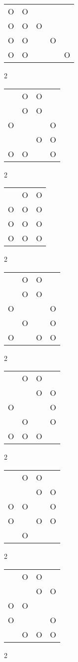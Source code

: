 \begin{tabular}{|m{0.2cm}m{0.2cm}m{0.2cm}m{0.2cm}m{0.2cm}|}\hline
O&O& & & \\
O&O&O& & \\
O&O& &O& \\
O&O& & &O\\
\hline\end{tabular}2
\begin{tabular}{|m{0.2cm}m{0.2cm}m{0.2cm}m{0.2cm}|}\hline
 &O&O& \\
 &O&O& \\
O& & &O\\
 & &O&O\\
O&O& &O\\
\hline\end{tabular}2
\begin{tabular}{|m{0.2cm}m{0.2cm}m{0.2cm}|}\hline
 &O&O\\
O&O&O\\
O&O&O\\
O&O&O\\
\hline\end{tabular}2
\begin{tabular}{|m{0.2cm}m{0.2cm}m{0.2cm}m{0.2cm}|}\hline
 &O&O& \\
 &O&O& \\
O& & &O\\
 &O& &O\\
O& &O&O\\
\hline\end{tabular}2
\begin{tabular}{|m{0.2cm}m{0.2cm}m{0.2cm}m{0.2cm}|}\hline
 &O&O& \\
 & &O&O\\
O& & &O\\
 &O& &O\\
O&O&O& \\
\hline\end{tabular}2
\begin{tabular}{|m{0.2cm}m{0.2cm}m{0.2cm}m{0.2cm}|}\hline
 &O&O& \\
 & &O&O\\
O&O& &O\\
O& &O&O\\
 &O& & \\
\hline\end{tabular}2
\begin{tabular}{|m{0.2cm}m{0.2cm}m{0.2cm}m{0.2cm}|}\hline
 &O&O& \\
 & &O&O\\
O&O& & \\
O& & &O\\
 &O&O&O\\
\hline\end{tabular}2

